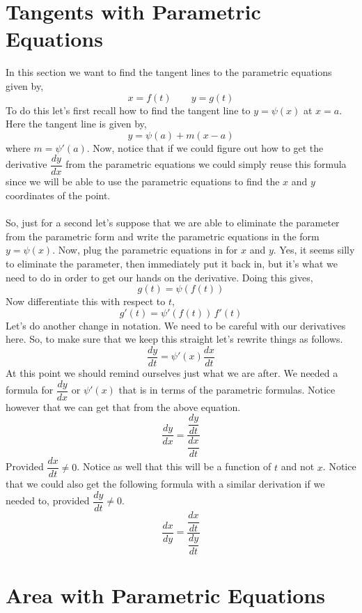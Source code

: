 \documentclass[10pt,reqno]{book}
\theoremstyle{definition}
\begin{document}
	\section{Tangents with Parametric Equations}
	
	In this section we want to find the tangent lines to the parametric equations given by,
	\[ x = f(t) \qquad y = g(t) \]
	To do this let's first recall how to find the tangent line to $ y = \psi(x) $ at $ x = a $. Here the tangent line is given by,
	\[ y = \psi(a) + m(x-a) \]
	where $ m = \psi'(a) $. Now, notice that if we could figure out how to get the derivative $ \dfrac{dy}{dx} $ from the parametric equations we could simply reuse this formula since we will be able to use the parametric equations to find the $ x $ and $ y $ coordinates of the point.\\ \\
	So, just for a second let's suppose that we are able to eliminate the parameter from the parametric form and write the parametric equations in the form $ y = \psi(x) $. Now, plug the parametric equations in for $ x $ and $ y $. Yes, it seems silly to eliminate the parameter, then immediately put it back in, but it's what we need to do in order to get our hands on the derivative. Doing this gives,
	\[ g(t) = \psi(f(t)) \]
	Now differentiate this with respect to $ t $,
	\[ g'(t) = \psi'(f(t))\,f'(t) \]
	Let's do another change in notation. We need to be careful with our derivatives here. So, to make sure that we keep this straight let's rewrite things as follows.
	\[ \frac{dy}{dt} = \psi'(x)\frac{dx}{dt} \]
	At this point we should remind ourselves just what we are after. We needed a formula for $ \dfrac{dy}{dx} $ or $ \psi'(x) $ that is in terms of the parametric formulas. Notice however that we can get that from the above equation.
	\[ \frac{dy}{dx} = \frac{\dfrac{dy}{dt}}{\dfrac{dx}{dt}} \]
	 Provided $ \dfrac{dx}{dt} \neq 0 $. Notice as well that this will be a function of $ t $ and not $ x $. Notice that we could also get the following formula with a similar derivation if we needed to, provided $ \dfrac{dy}{dt} \neq 0 $.
	 \[ \frac{dx}{dy} = \frac{\dfrac{dx}{dt}}{\dfrac{dy}{dt}} \]
	
	
	\section{Area with Parametric Equations}
	
\end{document}
